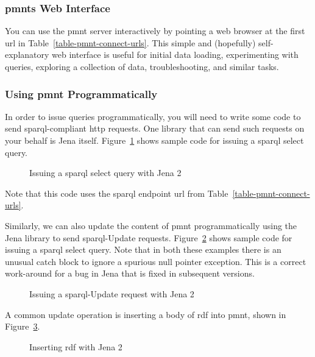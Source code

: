 \subsubsection{\acp{pmnt} Web Interface}

You can use the \ac{pmnt} server interactively by pointing a web browser at the first \ac{url} in Table~\ref{table-pmnt-connect-urls}.  This simple and (hopefully) self-explanatory web interface is useful for initial data loading, experimenting with queries, exploring a collection of data, troubleshooting, and similar tasks.

\subsubsection{Using \ac{pmnt} Programmatically}

In order to issue queries programmatically, you will need to write some code to send \ac{sparql}-compliant \ac{http} requests.  One library that can send such requests on your behalf is Jena itself.  Figure~\ref{figure-sparql-select-query-with-jena2} shows sample code for issuing a \ac{sparql} select query.
\begin{figure}[htbp]
	\footnotesize
	\caption{Issuing a \acs*{sparql} select query with Jena 2}
	\label{figure-sparql-select-query-with-jena2}
\end{figure}
Note that this code uses the \ac{sparql} endpoint \ac{url} from Table~\ref{table-pmnt-connect-urls}.

Similarly, we can also update the content of \ac{pmnt} programmatically using the Jena library to send \ac{sparql}-Update requests.  Figure~\ref{figure-sparql-update-with-jena-2} shows sample code for issuing a \ac{sparql} select query.  Note that in both these examples there is an unusual catch block to ignore a spurious null pointer exception.  This is a correct work-around for a bug in Jena that is fixed in subsequent versions.
\begin{figure}[htbp]
	\footnotesize
	\caption{Issuing a \acs*{sparql}-Update request with Jena 2}
	\label{figure-sparql-update-with-jena-2}
\end{figure}
A common update operation is inserting a body of \ac{rdf} into \ac{pmnt}, shown in Figure~\ref{figure-sparql-insert-with-jena-2}.
\begin{figure}[htbp]
	\footnotesize
	\caption{Inserting \acs*{rdf} with Jena 2}
	\label{figure-sparql-insert-with-jena-2}
\end{figure}

